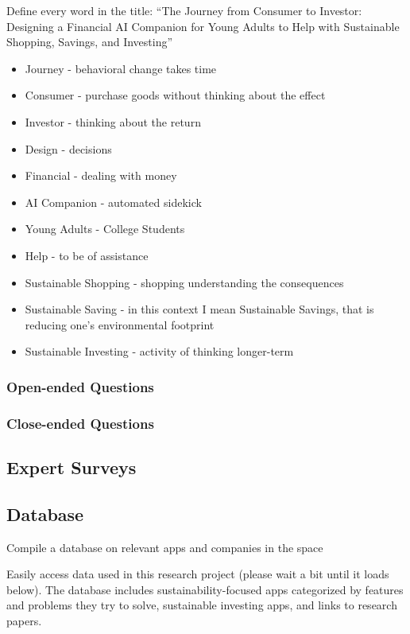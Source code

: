 \documentclass[
  letterpaper,
  DIV=11,
  numbers=noendperiod]{scrartcl}
\providecommand{\tightlist}{%
  \setlength{\itemsep}{0pt}\setlength{\parskip}{0pt}}\usepackage{longtable,booktabs,array}
\begin{document}
Define every word in the title: ``The Journey from Consumer to Investor:
Designing a Financial AI Companion for Young Adults to Help with
Sustainable Shopping, Savings, and Investing''

\begin{itemize}
\tightlist
\item
  Journey - behavioral change takes time
\item
  Consumer - purchase goods without thinking about the effect
\item
  Investor - thinking about the return
\item
  Design - decisions
\item
  Financial - dealing with money
\item
  AI Companion - automated sidekick
\item
  Young Adults - College Students
\item
  Help - to be of assistance
\item
  Sustainable Shopping - shopping understanding the consequences
\item
  Sustainable Saving - in this context I mean Sustainable Savings, that
  is reducing one's environmental footprint
\item
  Sustainable Investing - activity of thinking longer-term
\end{itemize}

\subsubsection{Open-ended Questions}\label{open-ended-questions}

\subsubsection{Close-ended Questions}\label{close-ended-questions}

\subsection{Expert Surveys}\label{expert-surveys}

\subsection{Database}\label{database}

Compile a database on relevant apps and companies in the space

Easily access data used in this research project (please wait a bit
until it loads below). The database includes sustainability-focused apps
categorized by features and problems they try to solve, sustainable
investing apps, and links to research papers.
\end{document}
